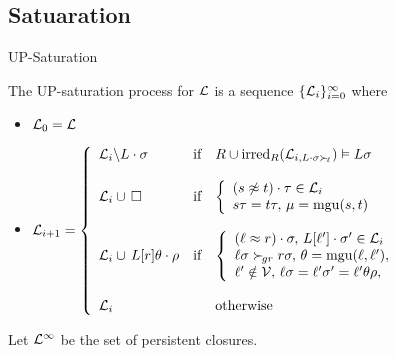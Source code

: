 \documentclass[%
handout,
]{beamer}
\begin{document}
\subsection{Satuaration}
\begin{frame}{UP-Saturation}

        The UP-{saturation process} for $\mathcal{L}$ is a sequence \( \{ \mathcal{L}_i \}_{i=0}^\infty \) where

        \begin{itemize}
            \item $\mathcal{L}_0 = \mathcal{L}$


        \item
        $\mathcal{L}_{i+1} = \left\{
                \begin{array}{lclc}
                    \mathcal{L}_i \backslash L\cdot\sigma
                    &\text{if}
                    &R \cup \operatorname{irred}_R(\mathcal{L}_{i,L\cdot\sigma\mathrel\succ_{\!\ell}}) \vDash L\sigma
                    \\
                    \\
                    \mathcal{L}_i \cup\,\square
                    &\text{if}
                    &\left\{\begin{array}{l}
                        (s\not\approx t)\cdot\tau\in\mathcal{L}_i
                        \\
                        s\tau = t\tau,\,
                        \mu=\operatorname{mgu}(s,t)
                    \end{array}\right.
                    \\
                    \\
                    \mathcal{L}_i \cup\, L[r]\theta\cdot\rho
                    &\text{if}
                    &\left\{\begin{array}{l}
                        (\ell\approx r)\cdot\sigma,\,
                        L[\ell']\cdot\sigma'\in\mathcal{L}_i
                        \\
                        \ell\sigma\mathrel\succ_{\!gr} r\sigma,\,
                        \theta=\operatorname{mgu}(\ell,\ell'),
                        \\
                        \ell'\notin\mathcal{V},\,
                        \ell\sigma = \ell'\sigma' = \ell'\theta\rho,
                    \end{array}\right.
                    \\
                    \\
                    \mathcal{L}_i
                    &&\text{otherwise}
                \end{array}
            \right.$
    \end{itemize}

\vspace{0.7em}

        Let \( \mathcal{L}^\infty \) be the set of persistent closures.


\end{frame}
\end{document}
